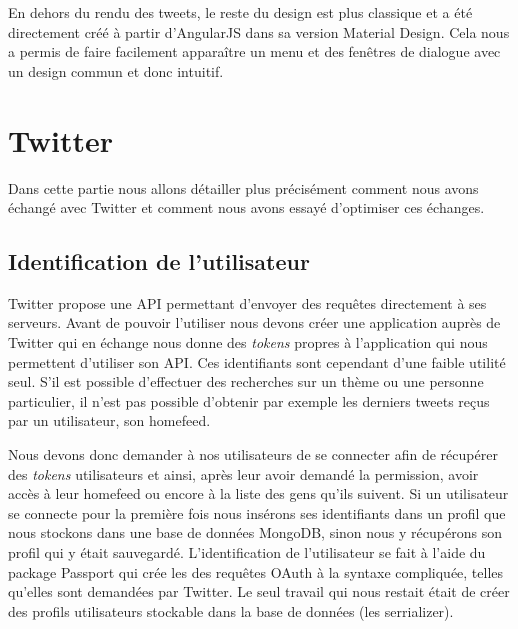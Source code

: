 \documentclass[a4paper]{article}
\begin{document}
En dehors du rendu des tweets, le reste du design est plus classique et a été directement créé à partir d'AngularJS dans sa version Material Design. Cela nous a permis de faire facilement apparaître un menu et des fenêtres de dialogue avec un design commun et donc intuitif.



\section{Twitter}

Dans cette partie nous allons détailler plus précisément comment nous avons échangé avec Twitter et comment nous avons essayé d'optimiser ces échanges.

\subsection{Identification de l'utilisateur}
Twitter propose une API permettant d'envoyer des requêtes directement à ses serveurs. Avant de pouvoir l'utiliser nous devons créer une application auprès de Twitter qui en échange nous donne des \emph{tokens} propres à l'application qui nous permettent d'utiliser son API. Ces identifiants sont cependant d'une faible utilité seul. S'il est possible d'effectuer des recherches sur un thème ou une personne particulier, il n'est pas possible d'obtenir par exemple les derniers tweets reçus par un utilisateur, son homefeed.

Nous devons donc demander à nos utilisateurs de se connecter afin de récupérer des \emph{tokens} utilisateurs et ainsi, après leur avoir demandé la permission, avoir accès à leur homefeed ou encore à la liste des gens qu'ils suivent. Si un utilisateur se connecte pour la première fois nous insérons ses identifiants dans un profil que nous stockons dans une base de données MongoDB, sinon nous y récupérons son profil qui y était sauvegardé. L'identification de l'utilisateur se fait à l'aide du package Passport qui crée les des requêtes OAuth à la syntaxe compliquée, telles qu'elles sont demandées par Twitter. Le seul travail qui nous restait était de créer des profils utilisateurs stockable dans la base de données (les serrializer).
\end{document}
